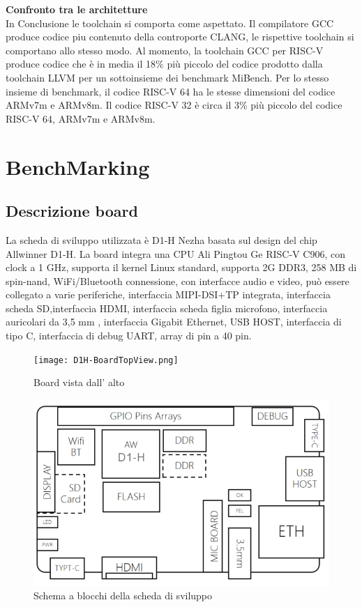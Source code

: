 \documentclass[12pt,a4paper]{report}
\begin{document}
\newpage
\textbf{Confronto tra le architetture}\\
In Conclusione le toolchain si comporta come aspettato. Il compilatore GCC produce codice piu contenuto della controporte CLANG, le rispettive toolchain si comportano allo stesso modo.
Al momento, la toolchain GCC per RISC-V produce codice che è in media il 18\% più piccolo del codice prodotto dalla toolchain LLVM per un sottoinsieme dei benchmark MiBench. Per lo stesso insieme di benchmark, il codice RISC-V 64 ha le stesse dimensioni del codice ARMv7m e ARMv8m. Il codice RISC-V 32 è circa il 3\% più piccolo del codice RISC-V 64, ARMv7m e ARMv8m.



\chapter{BenchMarking}
\section{Descrizione board}

La scheda di sviluppo utilizzata è  D1-H Nezha basata sul design del chip Allwinner D1-H. La board integra una CPU Ali Pingtou Ge RISC-V C906, con clock a 1 GHz, supporta il kernel Linux standard, supporta  2G DDR3, 258 MB di spin-nand, WiFi/Bluetooth connessione, con interfacce audio e video,  può essere collegato a varie periferiche, interfaccia MIPI-DSI+TP integrata, interfaccia scheda SD,interfaccia HDMI, interfaccia scheda figlia microfono, interfaccia auricolari da 3,5 mm , interfaccia Gigabit Ethernet, USB HOST, interfaccia di tipo C, interfaccia di debug UART, array di pin a 40 pin.

\begin{figure}
\texttt{[image: D1H-BoardTopView.png]}
\caption{Board vista dall' alto}

\includegraphics[width = \textwidth]{D1H-BoardBlockView.png}
\caption{Schema a blocchi della scheda di sviluppo}
\end{figure}
\end{document}

